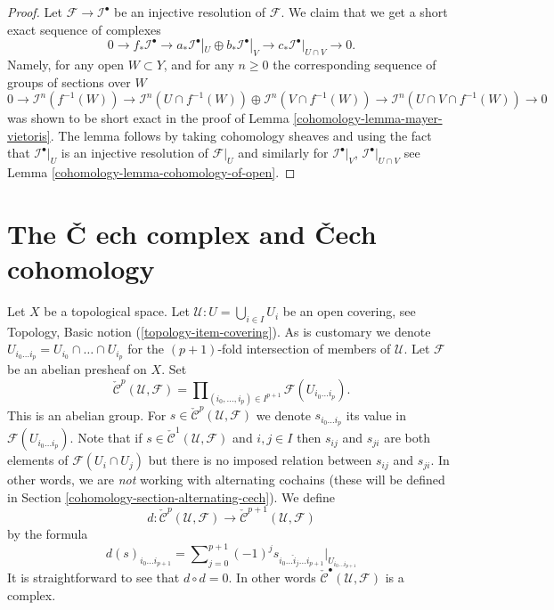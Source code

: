 \begin{proof}

Let $\mathcal{F} \to \mathcal{I}^\bullet$ be an injective resolution
of $\mathcal{F}$. We claim that we
get a short exact sequence of complexes
$$
0 \to
f_*\mathcal{I}^\bullet \to
a_*\mathcal{I}^\bullet|_U \oplus b_*\mathcal{I}^\bullet|_V \to
c_*\mathcal{I}^\bullet|_{U \cap V} \to
0.
$$
Namely, for any open $W \subset Y$, and for any $n \geq 0$ the
corresponding sequence of groups of sections over $W$
$$
0 \to
\mathcal{I}^n(f^{-1}(W)) \to
\mathcal{I}^n(U \cap f^{-1}(W))
\oplus \mathcal{I}^n(V \cap f^{-1}(W)) \to
\mathcal{I}^n(U \cap V \cap f^{-1}(W)) \to
0
$$
was shown to be short exact in the proof of Lemma \ref{cohomology-lemma-mayer-vietoris}.
The lemma follows by taking cohomology sheaves and using the fact that
$\mathcal{I}^\bullet|_U$ is an injective resolution of $\mathcal{F}|_U$
and similarly for $\mathcal{I}^\bullet|_V$, $\mathcal{I}^\bullet|_{U \cap V}$
see Lemma \ref{cohomology-lemma-cohomology-of-open}.
\end{proof}

\section{The {\v C}
ech complex and {\v C}ech cohomology}
\label{cohomology-section-cech}

Let $X$ be a topological space.
Let $\mathcal{U} : U = \bigcup_{i \in I} U_i$ be an open covering,
see Topology, Basic notion (\ref{topology-item-covering}).
As is customary we denote
$U_{i_0\ldots i_p} = U_{i_0} \cap \ldots \cap U_{i_p}$ for the
$(p + 1)$-fold intersection of members of $\mathcal{U}$.
Let $\mathcal{F}$ be an abelian presheaf on $X$.
Set
$$
\check{\mathcal{C}}^p(\mathcal{U}, \mathcal{F})
=
\prod\nolimits_{(i_0, \ldots, i_p) \in I^{p + 1}}
\mathcal{F}(U_{i_0\ldots i_p}).
$$
This is an abelian group. For
$s \in \check{\mathcal{C}}^p(\mathcal{U}, \mathcal{F})$ we denote
$s_{i_0\ldots i_p}$ its value in $\mathcal{F}(U_{i_0\ldots i_p})$.
Note that if $s \in \check{\mathcal{C}}^1(\mathcal{U}, \mathcal{F})$
and $i, j \in I$ then $s_{ij}$ and $s_{ji}$ are both elements
of $\mathcal{F}(U_i \cap U_j)$ but there is no imposed
relation between $s_{ij}$ and $s_{ji}$. In other words, we are {\it not}
working with alternating cochains (these will be defined
in Section \ref{cohomology-section-alternating-cech}). We define
$$
d : \check{\mathcal{C}}^p(\mathcal{U}, \mathcal{F})
\longrightarrow
\check{\mathcal{C}}^{p + 1}(\mathcal{U}, \mathcal{F})
$$
by the formula
\begin{equation}
\label{equation-d-cech}
d(s)_{i_0\ldots i_{p + 1}}
=
\sum\nolimits_{j = 0}^{p + 1}
(-1)^j
s_{i_0\ldots \hat i_j \ldots i_{p + 1}}|_{U_{i_0\ldots i_{p + 1}}}
\end{equation}
It is straightforward to see that $d \circ d = 0$. In other words
$\check{\mathcal{C}}^\bullet(\mathcal{U}, \mathcal{F})$ is a complex.


